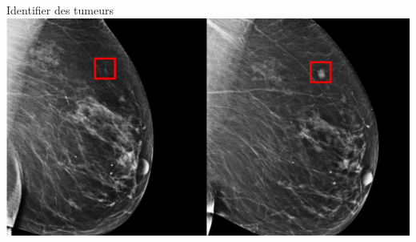\documentclass[aspectratio=169, usenames, dvipsnames]{beamer}
\begin{document}
\begin{frame}[t, c]{Identifier des tumeurs}{}
  \centering
  \vfill
  \includegraphics[width=\textwidth]{cancer}
  \vfill
\end{frame}
\end{document}
